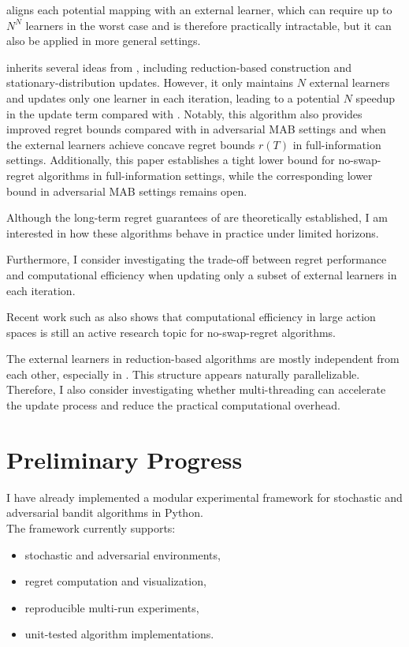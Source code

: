 \documentclass[12pt,a4paper]{article}
\begin{document}
\cite{stoltz2005internal} aligns each potential mapping with an external learner, which can require up to $N^N$ learners in the worst case and is therefore practically intractable, but it can also be applied in more general settings.

\cite{ito2020swap} inherits several ideas from \cite{blum2005internal}, including reduction-based construction and stationary-distribution updates.
However, it only maintains $N$ external learners and updates only one learner in each iteration, leading to a potential $N$ speedup in the update term compared with \cite{blum2005internal}.
Notably, this algorithm also provides improved regret bounds compared with \cite{blum2005internal} in adversarial MAB settings and when the external learners achieve concave regret bounds $r(T)$ in full-information settings.
Additionally, this paper establishes a tight lower bound for no-swap-regret algorithms in full-information settings, while the corresponding lower bound in adversarial MAB settings remains open.

Although the long-term regret guarantees of \cite{ito2020swap} are theoretically established, I am interested in how these algorithms behave in practice under limited horizons.

Furthermore, I consider investigating the trade-off between regret performance and computational efficiency when updating only a subset of external learners in each iteration.

Recent work such as \cite{dagan2024swap} also shows that computational efficiency in large action spaces is still an active research topic for no-swap-regret algorithms.

The external learners in reduction-based algorithms are mostly independent from each other, especially in \cite{blum2005internal}.
This structure appears naturally parallelizable.
Therefore, I also consider investigating whether multi-threading can accelerate the update process and reduce the practical computational overhead.

\section{Preliminary Progress}

I have already implemented a modular experimental framework for stochastic and adversarial bandit algorithms in Python.\\

The framework currently supports:
\begin{itemize}
    \item stochastic and adversarial environments,
    \item regret computation and visualization,
    \item reproducible multi-run experiments,
    \item unit-tested algorithm implementations.
\end{itemize}
\end{document}
